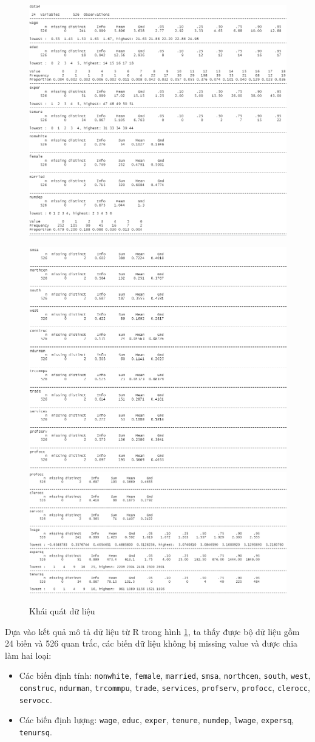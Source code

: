 \begin{figure}[H]
	\centering
	{\includegraphics[width=0.63\linewidth]{../Photo Of Result/describe(4)-1}}
\end{figure}
\begin{figure}[H]
	\centering
	{\includegraphics[width=0.63\linewidth]{../Photo Of Result/describe(4)-2}}
	{\includegraphics[width=0.63\linewidth]{../Photo Of Result/describe(4)-3}}
	\caption{Khái quát dữ liệu}
	\label{describe-4}
\end{figure}

Dựa vào kết quả mô tả dữ liệu từ R trong hình \ref{describe-4}, ta thấy được bộ dữ liệu gồm  24 biến và 526 quan trắc, các biến dữ liệu không bị missing value và được chia làm hai loại:
\begin{itemize}
	\item Các biến định tính: \texttt{nonwhite}, \texttt{female}, \texttt{married}, \texttt{smsa}, \texttt{northcen}, \texttt{south}, \texttt{west}, \texttt{construc}, \texttt{ndurman}, \texttt{trcommpu}, \texttt{trade}, \texttt{services}, \texttt{profserv}, \texttt{profocc}, \texttt{clerocc}, \texttt{servocc}.
	\item Các biến định lượng: \texttt{wage}, \texttt{educ}, \texttt{exper}, \texttt{tenure}, \texttt{numdep}, \texttt{lwage}, \texttt{expersq}, \texttt{tenursq}.
\end{itemize}

